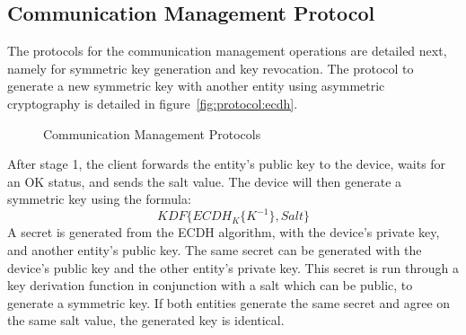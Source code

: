 \subsection{Communication Management Protocol}\label{chap:implementation:protocol:key}

The protocols for the communication management operations are detailed next, namely for symmetric key generation and key revocation. 
The protocol to generate a new symmetric key with another entity using asymmetric cryptography is detailed in figure~\ref{fig:protocol:ecdh}.

\begin{figure}[h!]
	\centering
	\caption{Communication Management Protocols}
\end{figure}

After stage 1, the client forwards the entity's public key to the device, waits for an OK status, and sends the salt value.
The device will then generate a symmetric key using the formula:
\[KDF\{ECDH_{K}\{K^{-1}\}, Salt\}\]
A secret is generated from the \ac{ECDH} algorithm, with the device's private key, and another entity's public key. The same secret can be generated with the device's public key and the other entity's private key. 
This secret is run through a key derivation function in conjunction with a salt which can be public, to generate a symmetric key. If both entities generate the same secret and agree on the same salt value, the generated key is identical.

